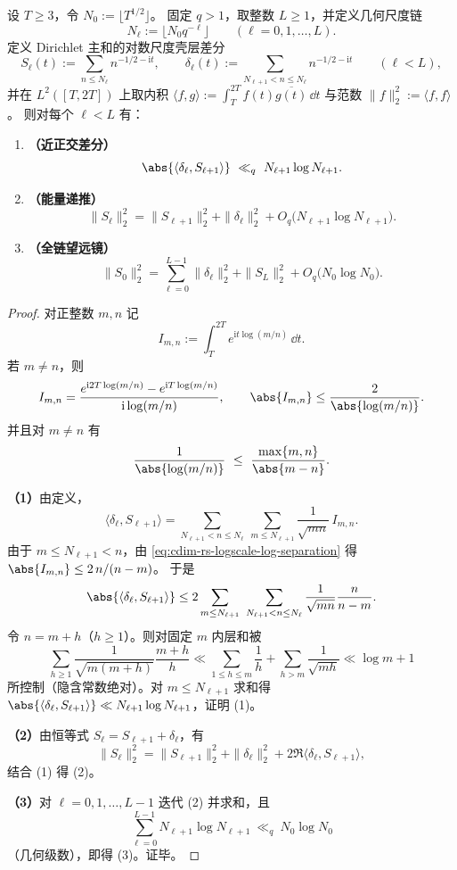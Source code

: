 \begin{theorem}[对数尺度壳层的伪鞅正交递归]\label{thm:cdim-rs-logscale-pseudomartingale-orthogonal-recursion}
设 \(T\ge 3\)，令 \(N_0:=\lfloor T^{1/2}\rfloor\)。
固定 \(q>1\)，取整数 \(L\ge 1\)，并定义几何尺度链
\[
N_\ell:=\bigl\lfloor N_0 q^{-\ell}\bigr\rfloor\qquad(\ell=0,1,\dots,L).
\]
定义 Dirichlet 主和的对数尺度壳层差分
\[
S_\ell(t):=\sum_{n\le N_\ell}n^{-1/2-\mathrm{i}t},
\qquad
\delta_\ell(t):=\sum_{N_{\ell+1}<n\le N_\ell}n^{-1/2-\mathrm{i}t}
\qquad(\ell<L),
\]
并在 \(L^2([T,2T])\) 上取内积 \(\langle f,g\rangle:=\int_T^{2T}f(t)\overline{g(t)}\,\dd t\) 与范数 \(\|f\|_2^2:=\langle f,f\rangle\)。
则对每个 \(\ell<L\) 有：
\begin{enumerate}
  \item \textbf{（近正交差分）}
  \[
  \abs{\langle \delta_\ell,S_{\ell+1}\rangle}\ \ll_q\ N_{\ell+1}\log N_{\ell+1}.
  \]
  \item \textbf{（能量递推）}
  \[
  \|S_\ell\|_2^2
  =\|S_{\ell+1}\|_2^2+\|\delta_\ell\|_2^2
  +O_q\!\bigl(N_{\ell+1}\log N_{\ell+1}\bigr).
  \]
  \item \textbf{（全链望远镜）}
  \[
  \|S_0\|_2^2
  =\sum_{\ell=0}^{L-1}\|\delta_\ell\|_2^2+\|S_L\|_2^2
  +O_q\!\bigl(N_0\log N_0\bigr).
  \]
\end{enumerate}
\end{theorem}

\begin{proof}
对正整数 \(m,n\) 记
\[
I_{m,n}:=\int_T^{2T}e^{\mathrm{i}t\log(m/n)}\,\dd t.
\]
若 \(m\neq n\)，则
\[
I_{m,n}=\frac{e^{\mathrm{i}2T\log(m/n)}-e^{\mathrm{i}T\log(m/n)}}{\mathrm{i}\log(m/n)},
\qquad
\abs{I_{m,n}}\le \frac{2}{\abs{\log(m/n)}}.
\]
并且对 \(m\neq n\) 有
\begin{equation}\label{eq:cdim-rs-logscale-log-separation}
\frac{1}{\abs{\log(m/n)}}\ \le\ \frac{\max\{m,n\}}{\abs{m-n}}.
\end{equation}
\par
\textbf{（1）}由定义，
\[
\langle \delta_\ell,S_{\ell+1}\rangle
=\sum_{N_{\ell+1}<n\le N_\ell}\ \sum_{m\le N_{\ell+1}}
\frac{1}{\sqrt{mn}}\,I_{m,n}.
\]
由于 \(m\le N_{\ell+1}<n\)，由 \eqref{eq:cdim-rs-logscale-log-separation} 得
\(
\abs{I_{m,n}}\le 2\,n/(n-m)
\)。
于是
\[
\abs{\langle \delta_\ell,S_{\ell+1}\rangle}
\le
2\sum_{m\le N_{\ell+1}}\ \sum_{N_{\ell+1}<n\le N_\ell}
\frac{1}{\sqrt{mn}}\frac{n}{n-m}.
\]
令 \(n=m+h\)（\(h\ge 1\)）。则对固定 \(m\) 内层和被
\[
\sum_{h\ge 1}\frac{1}{\sqrt{m(m+h)}}\frac{m+h}{h}
\ll
\sum_{1\le h\le m}\frac{1}{h}+\sum_{h>m}\frac{1}{\sqrt{mh}}
\ll
\log m+1
\]
所控制（隐含常数绝对）。对 \(m\le N_{\ell+1}\) 求和得
\(
\abs{\langle \delta_\ell,S_{\ell+1}\rangle}\ll N_{\ell+1}\log N_{\ell+1}
\)，证明 (1)。
\par
\textbf{（2）}由恒等式 \(S_\ell=S_{\ell+1}+\delta_\ell\)，有
\[
\|S_\ell\|_2^2=\|S_{\ell+1}\|_2^2+\|\delta_\ell\|_2^2+2\Re\langle \delta_\ell,S_{\ell+1}\rangle,
\]
结合 (1) 得 (2)。
\par
\textbf{（3）}对 \(\ell=0,1,\dots,L-1\) 迭代 (2) 并求和，且
\[
\sum_{\ell=0}^{L-1}N_{\ell+1}\log N_{\ell+1}\ \ll_q\ N_0\log N_0
\]
（几何级数），即得 (3)。证毕。
\end{proof}

